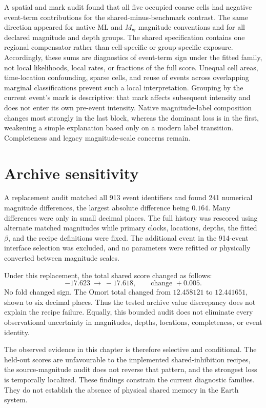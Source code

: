 A spatial and mark audit found that all five occupied coarse cells had negative event-term contributions for the shared-minus-benchmark contrast. The same direction appeared for native ML and \(M_{\mathrm w}\) magnitude conventions and for all declared magnitude and depth groups. The shared specification contains one regional compensator rather than cell-specific or group-specific exposure. Accordingly, these sums are diagnostics of event-term sign under the fitted family, not local likelihoods, local rates, or fractions of the full score. Unequal cell areas, time-location confounding, sparse cells, and reuse of events across overlapping marginal classifications prevent such a local interpretation. Grouping by the current event's mark is descriptive: that mark affects subsequent intensity and does not enter its own pre-event intensity. Native magnitude-label composition changes most strongly in the last block, whereas the dominant loss is in the first, weakening a simple explanation based only on a modern label transition. Completeness and legacy magnitude-scale concerns remain.



\section{Archive sensitivity}

A replacement audit matched all 913 event identifiers and found 241 numerical magnitude differences, the largest absolute difference being \(0.164\). Many differences were only in small decimal places. The full history was rescored using alternate matched magnitudes while primary clocks, locations, depths, the fitted \(\beta\), and the recipe definitions were fixed. The additional event in the 914-event interface selection was excluded, and no parameters were refitted or physically converted between magnitude scales.

Under this replacement, the total shared score changed as follows:
\[
 -17.623\ \longrightarrow\ -17.618,
 \qquad \text{change }+0.005.
\]
No fold changed sign. The Omori total changed from \(12.458121\) to \(12.441651\), shown to six decimal places. Thus the tested archive value discrepancy does not explain the recipe failure. Equally, this bounded audit does not eliminate every observational uncertainty in magnitudes, depths, locations, completeness, or event identity.


The observed evidence in this chapter is therefore selective and conditional. The held-out scores are unfavourable to the implemented shared-inhibition recipes, the source-magnitude audit does not reverse that pattern, and the strongest loss is temporally localized. These findings constrain the current diagnostic families. They do not establish the absence of physical shared memory in the Earth system.

